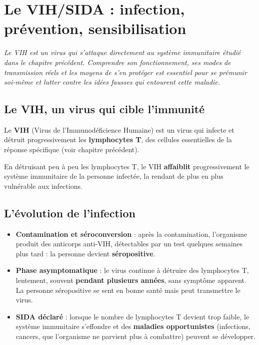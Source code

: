\chapter{Le VIH/SIDA : infection, prévention, sensibilisation}

\noindent\textit{Le VIH est un virus qui s'attaque directement au système immunitaire
étudié dans le chapitre précédent. Comprendre son fonctionnement, ses modes de
transmission réels et les moyens de s'en protéger est essentiel pour se prémunir soi-même
et lutter contre les idées fausses qui entourent cette maladie.}
\vspace{8pt}

\connecteBanner

\section{Le VIH, un virus qui cible l'immunité}

\begin{definition}[VIH]
Le \textbf{VIH} (Virus de l'Immunodéficience Humaine) est un virus qui infecte et détruit
progressivement les \textbf{lymphocytes T}, des cellules essentielles de la réponse
spécifique (voir chapitre précédent).
\end{definition}

\begin{propriete}[Conséquence]
En détruisant peu à peu les lymphocytes T, le VIH \textbf{affaiblit} progressivement le
système immunitaire de la personne infectée, la rendant de plus en plus vulnérable aux
infections.
\end{propriete}

\section{L'évolution de l'infection}

\begin{propriete}
\begin{itemize}
\item \textbf{Contamination et séroconversion} : après la contamination, l'organisme
produit des anticorps anti-VIH, détectables par un test quelques semaines plus tard : la
personne devient \textbf{séropositive}.
\item \textbf{Phase asymptomatique} : le virus continue à détruire des lymphocytes T,
lentement, souvent \textbf{pendant plusieurs années}, sans symptôme apparent. La personne
séropositive se sent en bonne santé mais peut transmettre le virus.
\item \textbf{SIDA déclaré} : lorsque le nombre de lymphocytes T devient trop faible, le
système immunitaire s'effondre et des \textbf{maladies opportunistes} (infections,
cancers, que l'organisme ne parvient plus à combattre) peuvent se développer.
\end{itemize}
\end{propriete}

